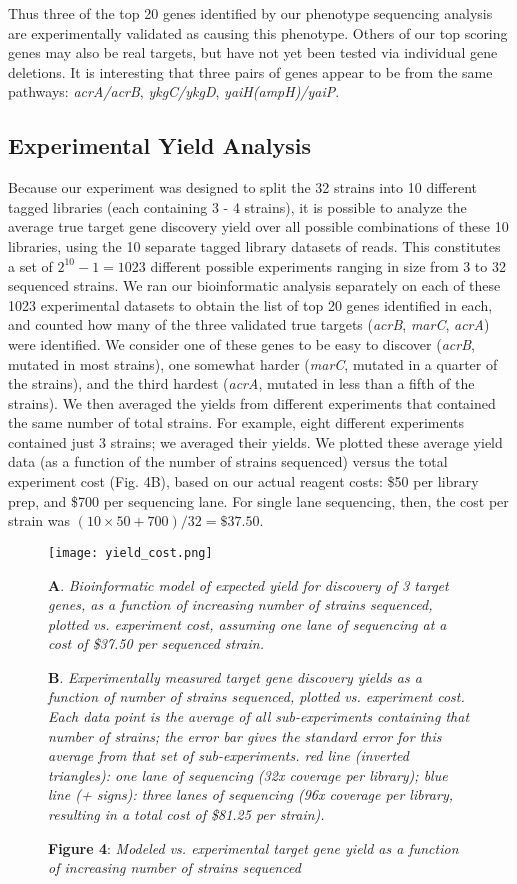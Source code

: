 \documentclass[letterpaper,10pt,english]{howto}
\begin{document}
Thus three of the top 20 genes identified by our phenotype
sequencing analysis are experimentally validated as causing this
phenotype.  Others of our top scoring genes may also be real targets,
but have not yet been tested via individual gene deletions.  It is
interesting that three pairs of genes appear to be
from the same pathways: \emph{acrA/acrB}, \emph{ykgC/ykgD}, \emph{yaiH(ampH)/yaiP}.


\subsection{Experimental Yield Analysis}

Because our experiment was designed to split the 32 strains into
10 different tagged libraries (each containing 3 - 4 strains),
it is possible to analyze the
average true target gene discovery yield over all possible
combinations of these 10 libraries, using the 10 separate
tagged library datasets of reads.  This constitutes a set of
$2^{10}-1=1023$ different possible experiments ranging
in size from 3 to 32 sequenced strains.  We ran our bioinformatic
analysis separately on each of these 1023 experimental datasets to obtain
the list of top 20 genes identified in each, and counted how many
of the three validated true targets (\emph{acrB}, \emph{marC}, \emph{acrA})
were identified.  We consider one of these genes to be
easy to discover (\emph{acrB}, mutated in most strains),
one somewhat harder (\emph{marC}, mutated in a quarter of the strains),
and the third hardest (\emph{acrA}, mutated in less than a fifth of
the strains).  We then averaged the yields from different
experiments that contained the same number of total strains.
For example, eight different experiments contained just 3 strains;
we averaged their yields.  We plotted these average yield data
(as a function of the number of strains sequenced) versus the
total experiment cost (Fig. 4B), based on our actual reagent costs:
\$50 per library prep, and \$700 per sequencing lane.  For
single lane sequencing, then, the cost per strain was
$(10 \times 50 + 700) / 32 = \$37.50$.
\hypertarget{yieldcostfig}{}\begin{figure}[htbp]
\centering

\texttt{[image: yield\_cost.png]}
\caption{\textbf{Figure 4}: \emph{Modeled vs. experimental target gene yield as a function
of increasing number of strains sequenced}}{\small 
\textbf{A}. \emph{Bioinformatic model of expected yield for discovery of
3 target genes, as a function of increasing number of strains
sequenced, plotted vs. experiment cost, assuming one lane of
sequencing at a cost of \$37.50 per sequenced strain.}

\textbf{B}. \emph{Experimentally measured target gene discovery yields
as a function of number of strains sequenced, plotted vs.
experiment cost.  Each data point is the average of all
sub-experiments containing that number of strains; the error
bar gives the standard error for this average from that
set of sub-experiments. red line (inverted triangles):
one lane of sequencing (32x coverage per library);
blue line (+ signs): three lanes of
sequencing (96x coverage per library, resulting in a total
cost of \$81.25 per strain).}
}\end{figure}
\end{document}
